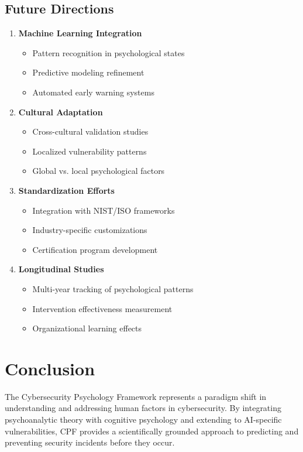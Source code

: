 \documentclass[11pt,a4paper]{article}
\begin{document}
\subsection{Future Directions}

\begin{enumerate}
\item \textbf{Machine Learning Integration}
   \begin{itemize}
   \item Pattern recognition in psychological states
   \item Predictive modeling refinement
   \item Automated early warning systems
   \end{itemize}

\item \textbf{Cultural Adaptation}
   \begin{itemize}
   \item Cross-cultural validation studies
   \item Localized vulnerability patterns
   \item Global vs. local psychological factors
   \end{itemize}

\item \textbf{Standardization Efforts}
   \begin{itemize}
   \item Integration with NIST/ISO frameworks
   \item Industry-specific customizations
   \item Certification program development
   \end{itemize}

\item \textbf{Longitudinal Studies}
   \begin{itemize}
   \item Multi-year tracking of psychological patterns
   \item Intervention effectiveness measurement
   \item Organizational learning effects
   \end{itemize}
\end{enumerate}

\section{Conclusion}

The Cybersecurity Psychology Framework represents a paradigm shift in understanding and addressing human factors in cybersecurity. By integrating psychoanalytic theory with cognitive psychology and extending to AI-specific vulnerabilities, CPF provides a scientifically grounded approach to predicting and preventing security incidents before they occur.
\end{document}
